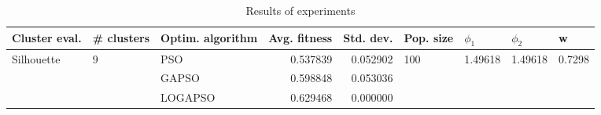\begin{table}
\centering
\caption{Results of experiments}
\begin{tabular}{lllrrllll}
\toprule
              Cluster eval. &        \# clusters & Optim. algorithm &  Avg. fitness &  Std. dev. &            Pop. size &               $\phi_{1}$ &               $\phi_{2}$ &                       w \\
\midrule
\multirow{3}{*}{Silhouette} & \multirow{3}{*}{9} &              PSO &      0.537839 &   0.052902 & \multirow{3}{*}{100} & \multirow{3}{*}{1.49618} & \multirow{3}{*}{1.49618} & \multirow{3}{*}{0.7298} \\
                            &                    &            GAPSO &      0.598848 &   0.053036 &                      &                          &                          &                         \\
                            &                    &          LOGAPSO &      0.629468 &   0.000000 &                      &                          &                          &                         \\
\bottomrule
\end{tabular}
\end{table}
